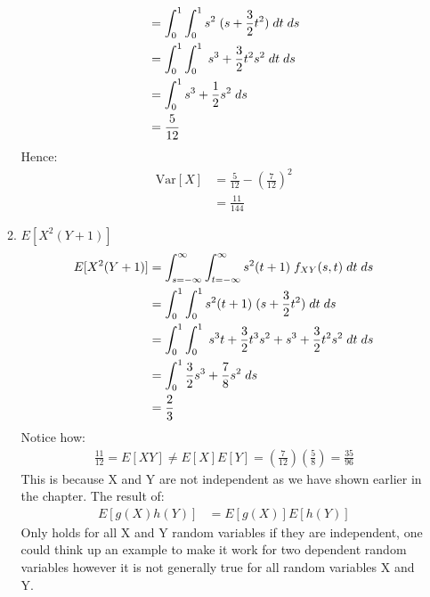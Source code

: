 \documentclass[,oneside]{article}
\begin{document}
\begin{enumerate}
\begin{enumerate}
\begin{align*}
&=\int_{0}^{1} \int_{0}^{1}s^2\hspace{0.1cm} (s+\frac{3}{2}t^2)\hspace{0.1cm}dt\hspace{0.1cm}ds\\
&=\int_{0}^{1} \int_{0}^{1}\hspace{0.1cm} s^3+\frac{3}{2}t^2 s^2\hspace{0.1cm}dt\hspace{0.1cm}ds\\
&=\int_{0}^{1} s^3+\frac{1}{2}s^2\hspace{0.1cm}ds\\
&= \frac{5}{12}
\end{align*}
Hence:
\begin{align*}
\text{Var}[X]&=\frac{5}{12}- \left ( \frac{7}{12}\right )^2\\
&= \frac{11}{144}
\end{align*}
\item $E[X^2(Y+1)]$
\begin{align*}
E[X^2(Y+1)]&=\int_{s=-\infty}^{\infty} \int_{t=-\infty}^{\infty}s^2(t+1)\hspace{0.1cm}f_{XY}(s,t)\hspace{0.1cm}dt\hspace{0.1cm}ds\\
&=\int_{0}^{1} \int_{0}^{1}s^2(t+1)\hspace{0.1cm} (s+\frac{3}{2}t^2)\hspace{0.1cm}dt\hspace{0.1cm}ds\\
&=\int_{0}^{1} \int_{0}^{1}\hspace{0.1cm} s^3 t+\frac{3}{2}t^3 s^2+s^3+\frac{3}{2}t^2 s^2\hspace{0.1cm}dt\hspace{0.1cm}ds\\
&=\int_{0}^{1} \frac{3}{2}s^3+\frac{7}{8}s^2\hspace{0.1cm}ds\\
&= \frac{2}{3}
\end{align*}
Notice how:
\begin{align*}
\frac{11}{12}=E[XY]\neq E[X]E[Y] = \left (\frac{7}{12}\right ) \left (\frac{5}{8} \right ) = \frac{35}{96}
\end{align*}
This is because X and Y are not independent as we have shown earlier in the chapter. The result of:
\begin{align*}
E[g(X)h(Y)]&=E[g(X)]E[h(Y)]
\end{align*}
Only holds for all X and Y random variables if they are independent, one could think up an example to make it work for two dependent random variables however it is not generally true for all random variables X and Y. \\ \\ 

\end{enumerate}
\end{enumerate}
\end{document}
